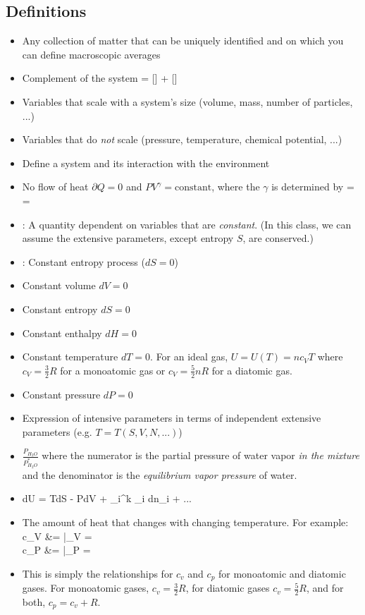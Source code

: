 \documentclass[12pt]{article}
\begin{document}
\subsection{Definitions}
\begin{itemize}
\item {} Any collection of matter that can be uniquely identified and on which you can define macroscopic averages
\item {}  Complement of the system
 = [] + []
\eqe
\item {} Variables that scale with a system's size (volume, mass, number of particles, ...)
\item {} Variables that do \emph{not} scale (pressure, temperature, chemical potential, ...)
\item {} Define a system and its interaction with the environment
\item {} No flow of heat $\partial Q = 0$ and $PV^{\gamma} = \text{constant}$, where the $\gamma$ is determined by
\eqs
\gamma =  = 
\eqe
\item {}: A quantity dependent on variables that are \emph{constant}.  (In this class, we can assume the extensive parameters, except entropy $S$, are conserved.)
\item {}: Constant entropy process ($dS=0$)
\item {} Constant volume $dV = 0$
\item {} Constant entropy $dS = 0$
\item {} Constant enthalpy $dH = 0$
\item {} Constant temperature $dT=0$.  For an ideal gas, $U = U(T) = n c_V T$ where $c_V = \frac{3}{2} R$ for a monoatomic gas or $c_V = \frac{5}{2} n R$ for a diatomic gas.
\item {} Constant pressure $dP = 0$
\item {} Expression of intensive parameters in terms of independent extensive parameters (e.g. $T= T(S,V,N,...)$)
\item {} $\frac{P_{H_2O}}{P_{H_2O}^*}$ where the numerator is the partial pressure of water vapor \emph{in the mixture} and the denominator is the \emph{equilibrium vapor pressure} of water.
\item {}
\eqs
dU = TdS - PdV + \sum_i^k \mu_i dn_i + ...
\eqe
\item {} The amount of heat that changes with changing temperature.  For example:
\eqs
c_V &= |_V = \\
c_P &= |_P = 
\eqe
\item {} This is simply the relationships for $c_v$ and $c_p$ for monoatomic and diatomic gases.  For monoatomic gases, $c_v = \frac{3}{2} R$, for diatomic gases $c_v = \frac{5}{2} R$, and for both, $c_p = c_v + R$.
\end{itemize}
\end{document}
